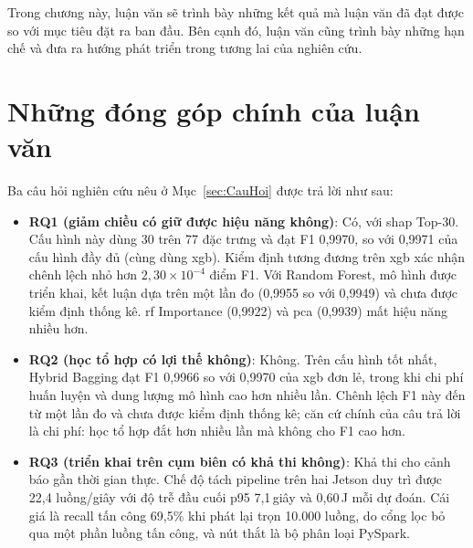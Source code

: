Trong chương này, luận văn sẽ trình bày những kết quả mà luận văn đã đạt được so với mục tiêu đặt ra ban đầu. Bên cạnh đó, luận văn cũng trình bày những hạn chế và đưa ra hướng phát triển trong tương lai của nghiên cứu.

\section{Những đóng góp chính của luận văn}
Ba câu hỏi nghiên cứu nêu ở Mục~\ref{sec:CauHoi} được trả lời như sau:
\begin{itemize}
    \item \textbf{RQ1 (giảm chiều có giữ được hiệu năng không)}: Có, với \ac{shap} Top-30. Cấu hình này dùng 30 trên 77 đặc trưng và đạt F1 0{,}9970, so với 0{,}9971 của cấu hình đầy đủ (cùng dùng \ac{xgb}). Kiểm định tương đương trên \ac{xgb} xác nhận chênh lệch nhỏ hơn $2{,}30 \times 10^{-4}$ điểm F1. Với Random Forest, mô hình được triển khai, kết luận dựa trên một lần đo (0{,}9955 so với 0{,}9949) và chưa được kiểm định thống kê. \ac{rf} Importance (0{,}9922) và \ac{pca} (0{,}9939) mất hiệu năng nhiều hơn.
    \item \textbf{RQ2 (học tổ hợp có lợi thế không)}: Không. Trên cấu hình tốt nhất, Hybrid Bagging đạt F1 0{,}9966 so với 0{,}9970 của \ac{xgb} đơn lẻ, trong khi chi phí huấn luyện và dung lượng mô hình cao hơn nhiều lần. Chênh lệch F1 này đến từ một lần đo và chưa được kiểm định thống kê; căn cứ chính của câu trả lời là chi phí: học tổ hợp đắt hơn nhiều lần mà không cho F1 cao hơn.
    \item \textbf{RQ3 (triển khai trên cụm biên có khả thi không)}: Khả thi cho cảnh báo gần thời gian thực. Chế độ tách pipeline trên hai Jetson duy trì được 22{,}4 luồng/giây với độ trễ đầu cuối p95 7{,}1\,giây và 0{,}60\,J mỗi dự đoán. Cái giá là recall tấn công 69{,}5\% khi phát lại trọn 10.000 luồng, do cổng lọc bỏ qua một phần luồng tấn công, và nút thắt là bộ phân loại PySpark.
\end{itemize}

